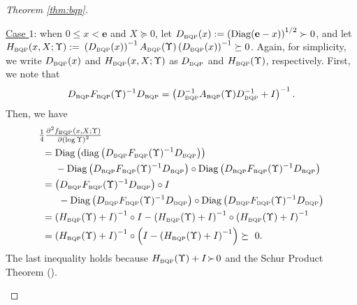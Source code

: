 \documentclass[smallextended]{svjour3hack}       %
\DeclareMathOperator{\Diag}{Diag}
\DeclareMathOperator{\diag}{diag}
\begin{document}
\begin{proof}[Theorem \ref{thm:bqp}]
\begin{itemize}
    \smallskip
    \underline{Case $1$}: when $0\le x<\mathbf{e}$ and $X\succeq 0$,  let $D_{{\tiny\mbox{BQP}}}(x):=\left(\Diag(\mathbf{e}-x)\right)^{1/2} \succ 0$, and let $H_{{\tiny\mbox{BQP}}}(x,X;\Upsilon):=$
    $\left(D_{{\tiny\mbox{BQP}}}(x)\right)^{-1} A_{{\tiny\mbox{BQP}}}(\Upsilon) \left(D_{{\tiny\mbox{BQP}}}(x)\right)^{-1}\succeq 0$. Again, for simplicity, we write $D_{{\tiny\mbox{BQP}}}(x)$ and $H_{{\tiny\mbox{BQP}}}(x,X;\Upsilon)$ as $D_{{\tiny\mbox{BQP}}}$ and $H_{{\tiny\mbox{BQP}}}(\Upsilon)$, respectively. First, we note that
    \begin{align*}
        D_{{\tiny\mbox{BQP}}}  F_{{\tiny\mbox{BQP}}}(\Upsilon)^{-1}D_{{\tiny\mbox{BQP}}} =\left( D_{{\tiny\mbox{BQP}}}^{-1} A_{{\tiny\mbox{BQP}}}(\Upsilon) D_{{\tiny\mbox{BQP}}}^{-1} + I\right)^{-1}.
    \end{align*}
    Then, we have
    \begin{align*}
        & \textstyle{\frac{1}{4}} \frac{\partial^2 f_{{\tiny\mbox{BQP}}}\left(x,X;\Upsilon\right)}{\partial \left(\log \Upsilon\right) ^2} \\
        &~= \Diag\left(\diag\left( D_{{\tiny\mbox{BQP}}}  F_{{\tiny\mbox{BQP}}}(\Upsilon)^{-1}D_{{\tiny\mbox{BQP}}}\right)\right) \\
        & ~~\quad -\Diag\left( D_{{\tiny\mbox{BQP}}}  F_{{\tiny\mbox{BQP}}}(\Upsilon)^{-1}D_{{\tiny\mbox{BQP}}}\right) \circ \Diag\left( D_{{\tiny\mbox{BQP}}}  F_{{\tiny\mbox{BQP}}}(\Upsilon)^{-1}D_{{\tiny\mbox{BQP}}}\right)\\
        & ~=\left( D_{{\tiny\mbox{BQP}}}  F_{{\tiny\mbox{BQP}}}(\Upsilon)^{-1}D_{{\tiny\mbox{BQP}}}\right)\circ I \\
        & ~~~\quad -\Diag\left( D_{{\tiny\mbox{BQP}}}  F_{{\tiny\mbox{BQP}}}(\Upsilon)^{-1}D_{{\tiny\mbox{BQP}}}\right) \circ \Diag\left( D_{{\tiny\mbox{BQP}}}  F_{{\tiny\mbox{BQP}}}(\Upsilon)^{-1}D_{{\tiny\mbox{BQP}}}\right)\\
        & ~=\left(H_{{\tiny\mbox{BQP}}}(\Upsilon)+I \right)^{-1}\circ I - \left(H_{{\tiny\mbox{BQP}}}(\Upsilon)+I \right)^{-1} \circ \left(H_{{\tiny\mbox{BQP}}}(\Upsilon)+I \right)^{-1}\\
        & ~=\left(H_{{\tiny\mbox{BQP}}}(\Upsilon)+I \right)^{-1} \circ \left(I - \left(H_{{\tiny\mbox{BQP}}}(\Upsilon)+I \right)^{-1} \right)
        \succeq~ 0.
    \end{align*}
    The last inequality holds because $H_{{\tiny\mbox{BQP}}}(\Upsilon)+I  \! \succ \! 0$ and
    the Schur Product Theorem (\cite[p. 15, Theorem VII]{Schur}).


\end{itemize}
\end{proof}
\end{document}
